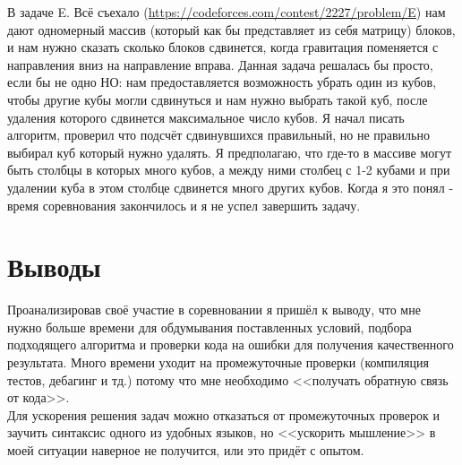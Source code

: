 \documentclass[oneside,a4paper,14pt]{extarticle} %
\begin{document}
  \newpage

  В задаче E. Всё съехало (\url{https://codeforces.com/contest/2227/problem/E}) нам дают одномерный массив (который как бы 
  представляет из себя матрицу) блоков, и нам нужно сказать сколько блоков сдвинется, когда гравитация поменяется с направления вниз
  на направление вправа. Данная задача решалась бы просто, если бы не одно НО: нам предоставляется возможность убрать один из кубов,
  чтобы другие кубы могли сдвинуться и нам нужно выбрать такой куб, после удаления которого сдвинется максимальное число кубов.
  Я начал писать алгоритм, проверил что подсчёт сдвинувшихся правильный, но не правильно выбирал куб который нужно удалять. Я предполагаю,
  что где-то в массиве могут быть столбцы в которых много кубов, а между ними столбец с 1-2 кубами и при удалении куба в этом столбце
  сдвинется много других кубов. Когда я это понял - время соревнования закончилось и я не успел завершить задачу.

  \section*{Выводы}
  Проанализировав своё участие в соревновании я пришёл к выводу, что мне нужно больше времени для обдумывания поставленных условий,
  подбора подходящего алгоритма и проверки кода на ошибки для получения качественного результата. Много времени уходит на промежуточные
  проверки (компиляция тестов, дебагинг и тд.) потому что мне необходимо <<получать обратную связь от кода>>. \\
  \newline
  \indent
  Для ускорения решения задач можно отказаться от промежуточных проверок и заучить синтаксис одного из удобных языков,
  но <<ускорить мышление>> в моей ситуации наверное не получится, или это придёт с опытом.
\end{document}
